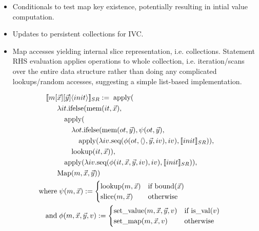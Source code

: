\def \sr#1{\llbracket #1 \rrbracket_{SR}}

\begin{itemize}
  \item Conditionals to test map key existence, potentially resulting in
  intial value computation.
  \item Updates to persistent collections for IVC.
  \item Map accesses yielding internal slice representation, i.e. collections.
  Statement RHS evaluation applies operations to whole collection, i.e.
  iteration/scans over the entire data structure rather than doing any
  complicated lookups/random accesses, suggesting a simple list-based
  implementation.
\end{itemize}

\begin{align*}
\sr{m[ & \vec{x}][\vec{y}] \tuple{init}} := \; \apply(\\
  & \lambda it. \ifelse(\mem(it, \vec{x}), \\
  & \quad \apply(\\
  & \quad \quad
    \lambda ot. \ifelse(\mem(ot, \vec{y}), \psi(ot, \vec{y}),\\
  & \quad \quad \quad
    \apply(\lambda iv. \seq(\phi(ot,\tuple{},\vec{y},iv), iv), \sr{init})), \\
  & \quad \quad \lookup(it, \vec{x})), \\
  & \quad \apply(\lambda iv.
       \seq(\phi(it,\vec{x},\vec{y},iv), iv), \sr{init})),\\
  & \ktcmap(m,\vec{x},\vec{y}))\\
\mbox{where} & \; \psi(m,\vec{x}) := 
                        \begin{cases}
                        \lookup(m,\vec{x}) & \mbox{if bound($\vec{x}$)}\\
                        \slice(m,\vec{x})  & \mbox{otherwise}
                        \end{cases}\\
\mbox{and}   & \; \phi(m,\vec{x},\vec{y},v) :=
                        \begin{cases}
                        \setval(m, \vec{x}, \vec{y}, v) & \mbox{if is\_val($v$)}
                        \\
                        \setmap(m, \vec{x}, v) & \mbox{otherwise}
                        \end{cases}
\end{align*}

